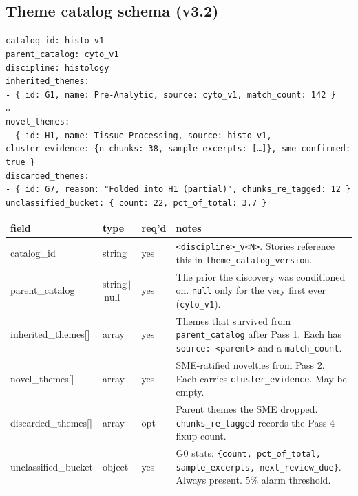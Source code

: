 \documentclass[10pt,letterpaper]{article}
\begin{document}
\subsection{Theme catalog schema (v3.2)}

\noindent\texttt{\scriptsize catalog\_id: histo\_v1\\
parent\_catalog: cyto\_v1\\
discipline: histology\\
inherited\_themes:\\
\hspace*{1em}- \{ id: G1, name: Pre-Analytic, source: cyto\_v1, match\_count: 142 \}\\
\hspace*{1em}\ldots\\
novel\_themes:\\
\hspace*{1em}- \{ id: H1, name: Tissue Processing, source: histo\_v1,\\
\hspace*{2em}cluster\_evidence: \{n\_chunks: 38, sample\_excerpts: [\ldots]\}, sme\_confirmed: true \}\\
discarded\_themes:\\
\hspace*{1em}- \{ id: G7, reason: "Folded into H1 (partial)", chunks\_re\_tagged: 12 \}\\
unclassified\_bucket: \{ count: 22, pct\_of\_total: 3.7 \}}

\begin{tabularx}{\textwidth}{@{}>{\ttfamily}p{3.4cm}p{1.8cm}p{1.4cm}X@{}}
\toprule
\textbf{field} & \textbf{type} & \textbf{req'd} & \textbf{notes} \\
\midrule
catalog\_id & string & yes & \texttt{<discipline>\_v<N>}. Stories reference this in \texttt{theme\_catalog\_version}. \\
parent\_catalog & string\,$|$\,null & yes & The prior the discovery was conditioned on. \texttt{null} only for the very first ever (\texttt{cyto\_v1}). \\
inherited\_themes[] & array & yes & Themes that survived from \texttt{parent\_catalog} after Pass 1. Each has \texttt{source: <parent>} and a \texttt{match\_count}. \\
novel\_themes[] & array & yes & SME-ratified novelties from Pass 2. Each carries \texttt{cluster\_evidence}. May be empty. \\
discarded\_themes[] & array & opt & Parent themes the SME dropped. \texttt{chunks\_re\_tagged} records the Pass 4 fixup count. \\
unclassified\_bucket & object & yes & G0 stats: \texttt{\{count, pct\_of\_total, sample\_excerpts, next\_review\_due\}}. Always present. 5\% alarm threshold. \\
\bottomrule
\end{tabularx}
\end{document}
